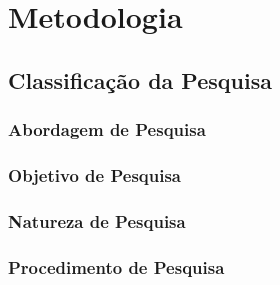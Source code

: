 \chapter{Metodologia}
\label{cap-metodologia}


\section{Classificação da Pesquisa}
\label{mtd-classificacao-pesquisa}


\subsection{Abordagem de Pesquisa}
\label{mtd-abordagem-pesquisa}

\subsection{Objetivo de Pesquisa}
\label{mtd-objetivo-pesquisa}

\subsection{Natureza de Pesquisa}
\label{mtd-natureza-pesquisa}

\subsection{Procedimento de Pesquisa}
\label{mtd-procedimento-pesquisa}

